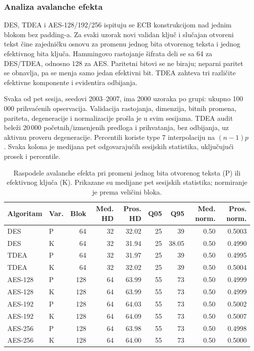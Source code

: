 \subsubsection{Analiza avalanche efekta}
DES, TDEA i AES-128/192/256 ispituju se ECB konstrukcijom nad jednim
blokom bez padding-a. Za svaki uzorak novi validan ključ i slučajan
otvoreni tekst čine zajedničku osnovu za promenu jednog bita otvorenog teksta i
jednog efektivnog bita ključa. Hammingovo rastojanje šifrata deli se
sa 64 za DES/TDEA, odnosno 128 za AES. Paritetni bitovi se ne biraju;
neparni paritet se obnavlja, pa se menja samo jedan efektivni bit.
TDEA zahteva tri različite efektivne komponente i evidentira odbijanja.

Svaka od pet sesija, seedovi 2003--2007, ima 2000 uzoraka po grupi:
ukupno 100\,000 prihvaćenih opservacija. Validacija rastojanja, dimenzija,
bitnih promena, pariteta, degeneracije i normalizacije prošla je u svim
sesijama. TDEA audit beleži 20\,000 početnih/izmenjenih predloga i
prihvatanja, bez odbijanja, uz aktivnu proveru degeneracije. Percentili
koriste type 7 interpolaciju na $(n-1)p$. Svaka kolona je medijana pet
odgovarajućih sesijskih statistika, uključujući prosek i percentile.

\begin{table}[htbp]
\centering
\small
\setlength{\tabcolsep}{3pt}
\caption{Raspodele avalanche efekta pri promeni jednog bita otvorenog
teksta (P) ili efektivnog ključa (K). Prikazane su medijane pet sesijskih
statistika; normiranje je prema veličini bloka.}
\label{tab:avalanche-effect-distributions}
\begin{tabular}{llrrrrrrr}
\toprule
Algoritam & Var. & Blok & Med. HD & Pros. HD & Q05 & Q95 & Med. norm. & Pros. norm. \\
\midrule
DES     & P & 64  & 32 & 32.02 & 25 & 39    & 0.50 & 0.5003 \\
DES     & K & 64  & 32 & 31.94 & 25 & 38.05 & 0.50 & 0.4990 \\
TDEA    & P & 64  & 32 & 31.97 & 25 & 39    & 0.50 & 0.4995 \\
TDEA    & K & 64  & 32 & 32.02 & 25 & 39    & 0.50 & 0.5004 \\
AES-128 & P & 128 & 64 & 63.99 & 55 & 73    & 0.50 & 0.4999 \\
AES-128 & K & 128 & 64 & 63.99 & 55 & 73    & 0.50 & 0.4999 \\
AES-192 & P & 128 & 64 & 64.03 & 55 & 73    & 0.50 & 0.5002 \\
AES-192 & K & 128 & 64 & 64.09 & 55 & 73    & 0.50 & 0.5007 \\
AES-256 & P & 128 & 64 & 63.98 & 55 & 73    & 0.50 & 0.4998 \\
AES-256 & K & 128 & 64 & 64.00 & 55 & 73    & 0.50 & 0.5000 \\
\bottomrule
\end{tabular}
\end{table}

